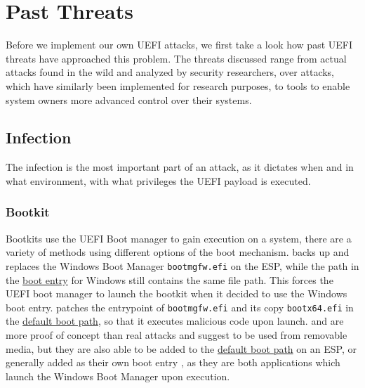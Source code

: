 
\chapter{Past Threats}


Before we implement our own \ac{UEFI} attacks, we first take a look how past \ac{UEFI} threats have approached this problem. The threats discussed range from actual attacks found in the wild and analyzed by security researchers, over attacks, which have similarly been implemented for research purposes, to tools to enable system owners more advanced control over their systems.

\section{Infection}

The infection is the most important part of an attack, as it dictates when and in what environment, with what privileges the \ac{UEFI} payload is executed.

\subsection{Bootkit}

Bootkits use the \ac{UEFI} Boot manager to gain execution on a system, there are a variety of methods using different options of the boot mechanism. \cite{finspy} backs up and replaces the Windows Boot Manager \lstinline{bootmgfw.efi} on the \ac{ESP}, while the path in the \hyperref[sec:uefi-pi:uefi:boot-manager:boot-variables]{boot entry} for Windows still contains the same file path. This forces the \ac{UEFI} boot manager to launch the bootkit when it decided to use the Windows boot entry. \cite{especter} patches the entrypoint of \lstinline{bootmgfw.efi} and its copy \lstinline{bootx64.efi} in the \hyperref[sec:uefi-pi:uefi:boot-manager]{default boot path}, so that it executes malicious code upon launch. \cite{dreamboot} and \cite{efiguard} are more proof of concept than real attacks and suggest to be used from removable media, but they are also able to be added to the \hyperref[sec:uefi-pi:uefi:boot-manager]{default boot path} on an \ac{ESP}, or generally added as their own boot entry \cite{efiguard}, as they are both applications which launch the Windows Boot Manager upon execution. 

